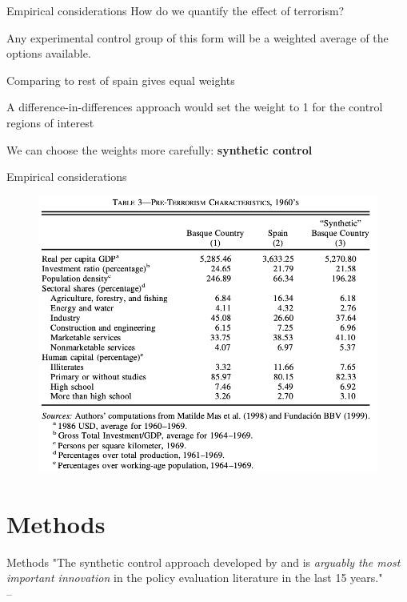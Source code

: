 \documentclass[notes,11pt, aspectratio=169]{beamer}
\newenvironment{wideitemize}{\itemize\addtolength{\itemsep}{10pt}}{\enditemize}
\begin{document}
\begin{frame}{Empirical considerations}
    How do we quantify the effect of terrorism? \\
    \bigskip 
    
     \pause 

    \bigskip \bigskip 
    
    Any experimental control group of this form will be a weighted average of the options available. \medskip
        \begin{wideitemize}
           \item Comparing to rest of spain gives equal weights 
           \item A difference-in-differences approach would set the weight to 1 for the control regions of interest
           \item We can choose the weights more carefully: \textbf{synthetic control}
        \end{wideitemize}
    
\end{frame}

\begin{frame}{Empirical considerations}
    \begin{figure}
        \centering
        \includegraphics[width = .6\textwidth]{figures/balance panel all.png}
        \label{fig:my_label}
    \end{figure}
\end{frame}

\section{Methods}

\begin{frame}{Methods}
\center "The synthetic control approach developed by \cite{abadie_synthetic_2010} and \cite{abadie_economic_2003} is \textit{arguably the most important innovation} in the policy evaluation literature in the last 15 years." 
	\\ \medskip \medskip \medskip \hspace*{\fill} --\cite{athey_state_2017}
\end{frame}
\end{document}

